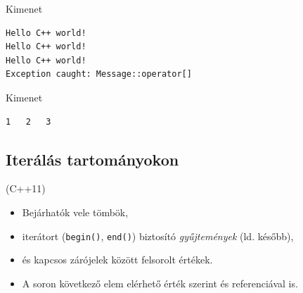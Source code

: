 \begin{frame}[fragile]
    \begin{exampleblock}{}
        \footnotesize
        
    \end{exampleblock}
    \begin{block}{Kimenet}
        \vspace{-.3cm}
        \scriptsize
        \begin{verbatim}
Hello C++ world!
Hello C++ world!
Hello C++ world!
Exception caught: Message::operator[]
\end{verbatim}
    \vspace{-.3cm}
    \end{block}
\end{frame}

\begin{frame}[fragile]
    \begin{exampleblock}{}
        \scriptsize
        
    \end{exampleblock}
    \begin{block}{Kimenet}
        \vspace{-.3cm}
        \scriptsize
        \begin{verbatim}
1   2   3          
\end{verbatim}
    \vspace{-.3cm}
    \end{block}
\end{frame}

\subsection{Iterálás tartományokon}

\begin{frame}
     (C++11)
    \begin{itemize}
        \item Bejárhatók vele tömbök,
        \item iterátort (\texttt{begin()}, \texttt{end()}) biztosító \emph{gyűjtemények} (ld. később),
        \item és kapcsos zárójelek között felsorolt értékek.
        \item A soron következő elem elérhető érték szerint és referenciával is.
    \end{itemize}
\end{frame}

